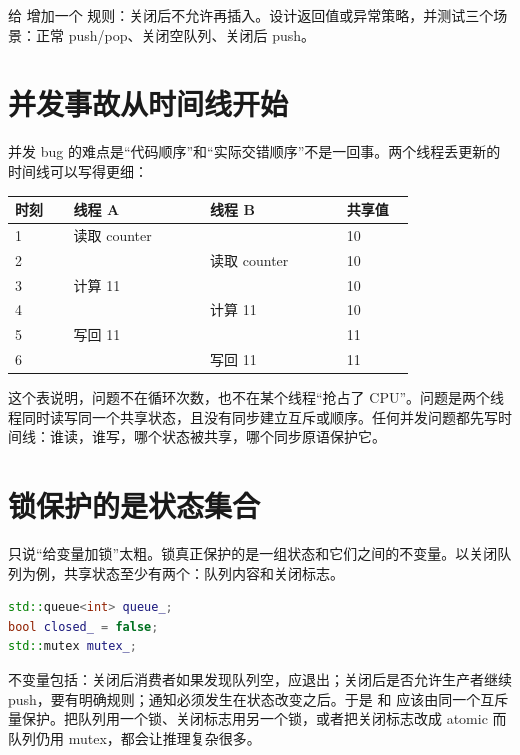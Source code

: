 \begin{exercisebox}
给  增加一个  规则：关闭后不允许再插入。设计返回值或异常策略，并测试三个场景：正常 push/pop、关闭空队列、关闭后 push。
\end{exercisebox}

\section{并发事故从时间线开始}

并发 bug 的难点是“代码顺序”和“实际交错顺序”不是一回事。两个线程丢更新的时间线可以写得更细：

\begin{longtable}{p{0.12\linewidth}p{0.28\linewidth}p{0.28\linewidth}p{0.14\linewidth}}
\toprule
时刻 & 线程 A & 线程 B & 共享值 \\
\midrule
1 & 读取 counter &  & 10 \\
2 &  & 读取 counter & 10 \\
3 & 计算 11 &  & 10 \\
4 &  & 计算 11 & 10 \\
5 & 写回 11 &  & 11 \\
6 &  & 写回 11 & 11 \\
\bottomrule
\end{longtable}

这个表说明，问题不在循环次数，也不在某个线程“抢占了 CPU”。问题是两个线程同时读写同一个共享状态，且没有同步建立互斥或顺序。任何并发问题都先写时间线：谁读，谁写，哪个状态被共享，哪个同步原语保护它。

\section{锁保护的是状态集合}

只说“给变量加锁”太粗。锁真正保护的是一组状态和它们之间的不变量。以关闭队列为例，共享状态至少有两个：队列内容和关闭标志。

\begin{lstlisting}[language=C++,caption={队列内容和关闭状态必须一起保护}]
std::queue<int> queue_;
bool closed_ = false;
std::mutex mutex_;
\end{lstlisting}

不变量包括：关闭后消费者如果发现队列空，应退出；关闭后是否允许生产者继续 push，要有明确规则；通知必须发生在状态改变之后。于是  和  应该由同一个互斥量保护。把队列用一个锁、关闭标志用另一个锁，或者把关闭标志改成 atomic 而队列仍用 mutex，都会让推理复杂很多。

